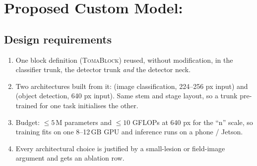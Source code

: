 \section{Proposed Custom Model: \model}
\label{sec:model}

\subsection{Design requirements}
\begin{enumerate}
  \item One block definition (\textsc{TomaBlock}) reused, without modification, in the classifier trunk, the detector trunk \emph{and} the detector neck.
  \item Two architectures built from it: \modelcls{} (image classification, 224--256 px input) and \modeldet{} (object detection, 640 px input). Same stem and stage layout, so a trunk pre-trained for one task initialises the other.
  \item Budget: $\le 5$\,M parameters and $\le 10$ GFLOPs at 640 px for the ``n'' scale, so training fits on one 8--12\,GB GPU and inference runs on a phone / Jetson.
  \item Every architectural choice is justified by a small-lesion or field-image argument and gets an ablation row.
\end{enumerate}

